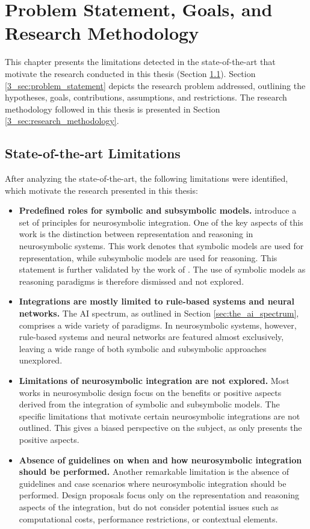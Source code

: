 \chapter{Problem Statement, Goals, and Research Methodology}\label{chap:methodology}

This chapter presents the limitations detected in the state-of-the-art that motivate the research conducted in this thesis (Section \ref{3_sec:limitations}). Section \ref{3_sec:problem_statement} depicts the research problem addressed, outlining the hypotheses, goals, contributions, assumptions, and restrictions. The research methodology followed in this thesis is presented in Section \ref{3_sec:research_methodology}.

\section{State-of-the-art Limitations}\label{3_sec:limitations}
After analyzing the state-of-the-art, the following limitations were identified, which motivate the research presented in this thesis:
\begin{itemize}
    \item \textbf{Predefined roles for symbolic and subsymbolic models.} \cite{besold_neural-symbolic_2017} introduce a set of principles for neurosymbolic integration. One of the key aspects of this work is the distinction between representation and reasoning in neurosymbolic systems. This work denotes that symbolic models are used for representation, while subsymbolic models are used for reasoning. This statement is further validated by the work of \cite{garcez_neural-symbolic_2019}. The use of symbolic models as reasoning paradigms is therefore dismissed and not explored.
    
    \item \textbf{Integrations are mostly limited to rule-based systems and neural networks.} The AI spectrum, as outlined in Section \ref{sec:the_ai_spectrum}, comprises a wide variety of paradigms. In neurosymbolic systems, however, rule-based systems and neural networks are featured almost exclusively, leaving a wide range of both symbolic and subsymbolic approaches unexplored. 
    
    \item \textbf{Limitations of neurosymbolic integration are not explored.} Most works in neurosymbolic design focus on the benefits or positive aspects derived from the integration of symbolic and subsymbolic models. The specific limitations that motivate certain neurosymbolic integrations are not outlined. This gives a biased perspective on the subject, as only presents the positive aspects.
    
    \item \textbf{Absence of guidelines on when and how neurosymbolic integration should be performed.} Another remarkable limitation is the absence of guidelines and case scenarios where neurosymbolic integration should be performed. Design proposals focus only on the representation and reasoning aspects of the integration, but do not consider potential issues such as computational costs, performance restrictions, or contextual elements. 
\end{itemize}


